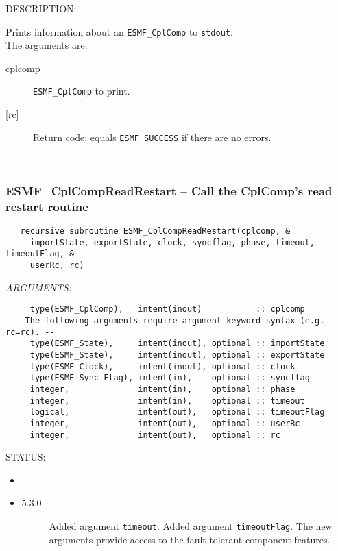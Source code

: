 {\sf DESCRIPTION:\\ }


   Prints information about an {\tt ESMF\_CplComp} to {\tt stdout}. \\
  
   The arguments are:
   \begin{description}
   \item[cplcomp]
     {\tt ESMF\_CplComp} to print.
   \item[{[rc]}]
     Return code; equals {\tt ESMF\_SUCCESS} if there are no errors.
   \end{description}
   
 
\mbox{}\hrulefill\ 
 
\subsubsection [ESMF\_CplCompReadRestart] {ESMF\_CplCompReadRestart -- Call the CplComp's read restart routine}


  
\begin{verbatim}   recursive subroutine ESMF_CplCompReadRestart(cplcomp, &
     importState, exportState, clock, syncflag, phase, timeout, timeoutFlag, &
     userRc, rc)\end{verbatim}{\em ARGUMENTS:}
\begin{verbatim}     type(ESMF_CplComp),   intent(inout)           :: cplcomp
 -- The following arguments require argument keyword syntax (e.g. rc=rc). --
     type(ESMF_State),     intent(inout), optional :: importState
     type(ESMF_State),     intent(inout), optional :: exportState
     type(ESMF_Clock),     intent(inout), optional :: clock
     type(ESMF_Sync_Flag), intent(in),    optional :: syncflag
     integer,              intent(in),    optional :: phase
     integer,              intent(in),    optional :: timeout
     logical,              intent(out),   optional :: timeoutFlag
     integer,              intent(out),   optional :: userRc
     integer,              intent(out),   optional :: rc\end{verbatim}
{\sf STATUS:}
   \begin{itemize}
   \item{}
   \item{}
   \begin{description}
   \item[5.3.0] Added argument {\tt timeout}.
                Added argument {\tt timeoutFlag}.
                The new arguments provide access to the fault-tolerant component
                features.
   \end{description}
   \end{itemize}
  
